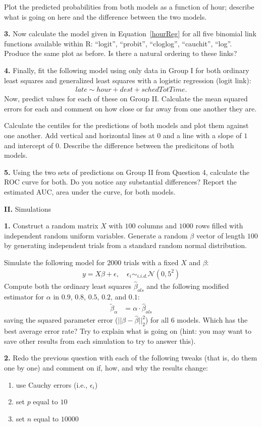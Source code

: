 \documentclass[12pt]{article}
\begin{document}
Plot the predicted probabilities from both models as a function of hour; describe
what is going on here and the difference between the two models.

{\bf 3.} Now calculate the model given in Equation~\ref{hourReg} for all five
binomial link functions available within R: ``logit'', ``probit'', ``cloglog'',
``cauchit'', ``log''. Produce the same plot as before. Is there a natural ordering
to these links?

{\bf 4.} Finally, fit the following model using only data in Group I for
both ordinary least squares and generalized least squares with a logistic
regression (logit link):
\begin{align}
late \sim hour + dest + schedTotTime.
\end{align}
Now, predict values for each of these on Group II. Calculate the mean squared
errors for each and comment on how close or far away from one another they
are.

Calculate the centiles for the predictions of both models and plot them against
one another. Add vertical and horizontal lines at $0$ and a line with a slope of
$1$ and intercept of $0$. Describe the difference between the predicitons of both
models.

{\bf 5.} Using the two sets of predictions on Group II from Question 4, calculate
the ROC curve for both. Do you notice any substantial differences? Report the estimated
AUC, area under the curve, for both models.

{\bf II.} Simulations

{\bf 1.} Construct a random matrix $X$ with $100$ columns and $1000$ rows filled
with independent random uniform variables. Generate a random $\beta$ vector of length
$100$ by generating independent trials from a standard random normal distribution.

Simulate the following model for $2000$ trials with a fixed $X$ and $\beta$:
\begin{align}
y = X \beta + \epsilon, \quad \epsilon_i \sim_{i.i.d.} \mathcal{N}(0, 5^2)
\end{align}
Compute both the ordinary least squares $\widehat{\beta}_{ols}$ and the following
modified estimator for $\alpha$ in $0.9$, $0.8$, $0.5$, $0.2$, and $0.1$:
\begin{align}
\widetilde{\beta}_\alpha &= \alpha \cdot \widehat{\beta}_{ols}
\end{align}
saving the squared parameter error ($|| \beta - \widehat{\beta} ||_2^2$) for all
$6$ models. Which has the best average error rate? Try to explain what is going on
(hint: you may want to save other results from each simulation to try
to answer this).

{\bf 2.} Redo the previous question with each of the following tweaks (that is,
do them one by one) and comment on if, how, and why the results change:
\begin{enumerate} \renewcommand{\theenumi}{\Alph{enumi}}
\item use Cauchy errors (i.e., $\epsilon_i$)
\item set $p$ equal to $10$
\item set $n$ equal to $10000$
\end{enumerate}
\end{document}
